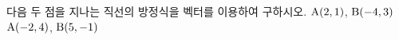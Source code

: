 다음 두 점을 지나는 직선의 방정식을 벡터를 이용하여 구하시오.
 $\mathrm{A}(2{,}\mkern3mu\mathopen{}1)$, $\mathrm{B}(-4{,}\mkern3mu\mathopen{}3)$
 $\mathrm{A}(-2{,}\mkern3mu\mathopen{}4)$, $\mathrm{B}(5{,}\mkern3mu\mathopen{}-1)$
